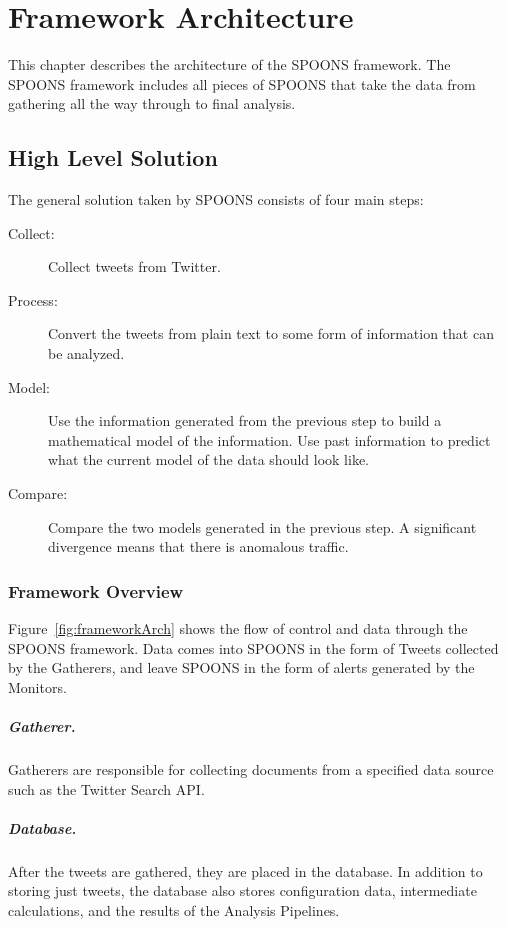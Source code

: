 \documentclass[12pt]{ucthesis}
\begin{document}
\chapter{Framework Architecture}
\label{arch-framework}
This chapter describes the architecture of the SPOONS framework. The SPOONS framework includes all pieces of SPOONS
that take the data from gathering all the way through to final analysis.

\section{High Level Solution}
\label{arch-framework-highlevel}
The general solution taken by SPOONS consists of four main steps:

\begin{description}
   \item[Collect:]
      Collect tweets from Twitter.
   \item[Process:]
      Convert the tweets from plain text to some form of information that can be analyzed.
   \item[Model:]
      Use the information generated from the previous step to build a mathematical model of the information.
      Use past information to predict what the current model of the data should look like.
   \item[Compare:]
      Compare the two models generated in the previous step. A significant divergence means that there is
      anomalous traffic.
\end{description}

\subsection{Framework Overview}
\label{arch-framework-highlevel-overview}

Figure~\ref{fig:frameworkArch} shows the flow of control and data through the SPOONS framework. Data comes into SPOONS
in the form of Tweets collected by the Gatherers, and leave SPOONS in the form of alerts generated by the Monitors.

\paragraph{Gatherer.}
Gatherers are responsible for collecting documents from a specified data source such as the Twitter Search API.

\paragraph{Database.}
After the tweets are gathered, they are placed in the database. In addition to storing just tweets, the database also stores
configuration data, intermediate calculations, and the results of the Analysis Pipelines.
\end{document}
